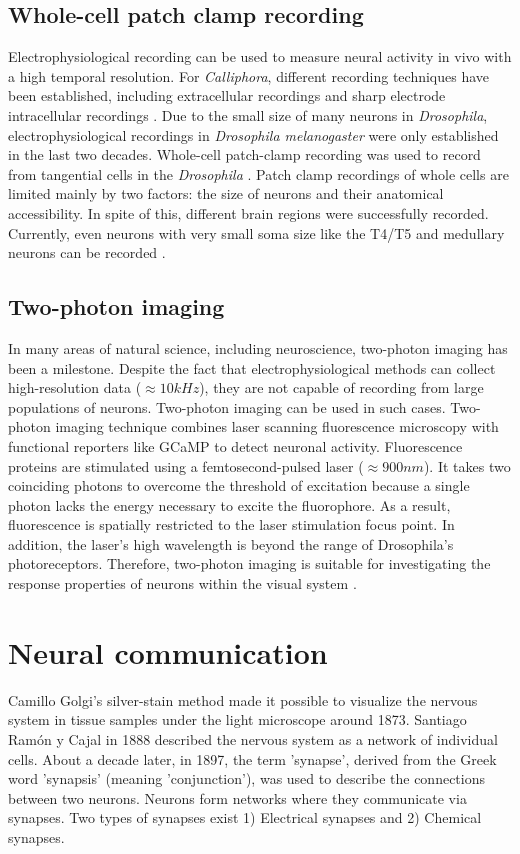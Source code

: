 \subsection{Whole-cell patch clamp recording}
Electrophysiological recording can be used to measure neural activity in vivo with a high temporal resolution. For \textit{Calliphora}, different recording techniques have been established, including extracellular recordings and sharp electrode intracellular recordings \parencite{Haag2001}. Due to the small size of many neurons in \textit{Drosophila}, electrophysiological recordings in \textit{Drosophila melanogaster} were only established in the last two decades. Whole-cell patch-clamp recording was used to record from tangential cells in the \textit{Drosophila} \parencite{ Joesch2008}. Patch clamp recordings of whole cells are limited mainly by two factors: the size of neurons and their anatomical accessibility. In spite of this, different brain regions were successfully recorded. Currently, even neurons with very small soma size like the T4/T5 and medullary neurons can be recorded \parencite{Gruntman2018, Groschner2022}.

\subsection{Two-photon imaging}
In many areas of natural science, including neuroscience, two-photon imaging \parencite{Denk1990} has been a milestone. Despite the fact that electrophysiological methods can collect high-resolution data ($\approx 10kHz$), they are not capable of recording from large populations of neurons. Two-photon imaging can be used in such cases. Two-photon imaging technique combines laser scanning fluorescence microscopy with functional reporters like GCaMP to detect neuronal activity. Fluorescence proteins are stimulated using a femtosecond-pulsed laser ($\approx 900nm$). It takes two coinciding photons to overcome the threshold of excitation because a single photon lacks the energy necessary to excite the fluorophore. As a result, fluorescence is spatially restricted to the laser stimulation focus point. In addition, the laser's high wavelength is beyond the range of Drosophila's photoreceptors. Therefore, two-photon imaging is suitable for investigating the response properties of neurons within the visual system \parencite{Maisak2013}.

\section{Neural communication}
Camillo Golgi's silver-stain method made it possible to visualize the nervous system in tissue samples under the light microscope around 1873. Santiago Ramón y Cajal in 1888 described the nervous system as a network of individual cells. About a decade later, in 1897, the term 'synapse', derived from the Greek word 'synapsis' (meaning 'conjunction'), was used to describe the connections between two neurons. Neurons form networks where they communicate via synapses. Two types of synapses exist 1) Electrical synapses and 2) Chemical synapses.

